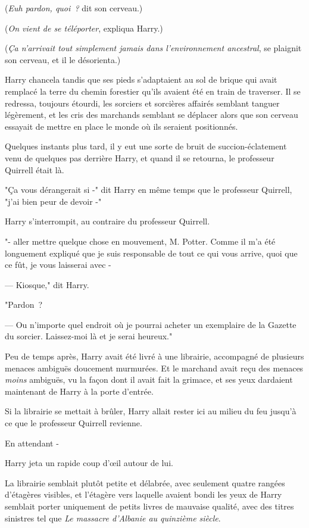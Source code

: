 (\emph{Euh pardon, quoi~?} dit son cerveau.)

(\emph{On vient de se téléporter}, expliqua Harry.)

(\emph{Ça n'arrivait tout simplement jamais dans l'environnement ancestral}, se plaignit son cerveau, et il le désorienta.)

Harry chancela tandis que ses pieds s'adaptaient au sol de brique qui avait remplacé la terre du chemin forestier qu'ils avaient été en train de traverser. Il se redressa, toujours étourdi, les sorciers et sorcières affairés semblant tanguer légèrement, et les cris des marchands semblant se déplacer alors que son cerveau essayait de mettre en place le monde où ils seraient positionnés.

Quelques instants plus tard, il y eut une sorte de bruit de succion-éclatement venu de quelques pas derrière Harry, et quand il se retourna, le professeur Quirrell était là.

"Ça vous dérangerait si -" dit Harry en même temps que le professeur Quirrell, "j'ai bien peur de devoir -"

Harry s'interrompit, au contraire du professeur Quirrell.

"- aller mettre quelque chose en mouvement, M. Potter. Comme il m'a été longuement expliqué que je suis responsable de tout ce qui vous arrive, quoi que ce fût, je vous laisserai avec -

--- Kiosque," dit Harry.

"Pardon~?

--- Ou n'importe quel endroit où je pourrai acheter un exemplaire de la Gazette du sorcier. Laissez-moi là et je serai heureux."

Peu de temps après, Harry avait été livré à une librairie, accompagné de plusieurs menaces ambiguës doucement murmurées. Et le marchand avait reçu des menaces \emph{moins} ambiguës, vu la façon dont il avait fait la grimace, et ses yeux dardaient maintenant de Harry à la porte d'entrée.

Si la librairie se mettait à brûler, Harry allait rester ici au milieu du feu jusqu'à ce que le professeur Quirrell revienne.

En attendant -

Harry jeta un rapide coup d'œil autour de lui.

La librairie semblait plutôt petite et délabrée, avec seulement quatre rangées d'étagères visibles, et l'étagère vers laquelle avaient bondi les yeux de Harry semblait porter uniquement de petits livres de mauvaise qualité, avec des titres sinistres tel que \emph{Le massacre d'Albanie au quinzième siècle}.

